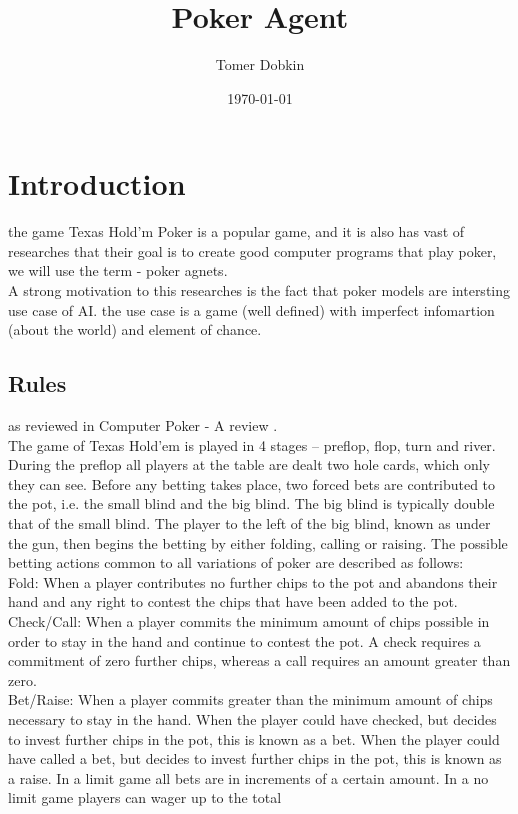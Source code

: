 \documentclass{article}
\title{Poker Agent}
\author{Tomer Dobkin}
\date{\today}
\begin{document}
\maketitle
\section{Introduction}
the game Texas Hold'm Poker is a popular game, and it is also has vast of researches that their goal is to create good computer programs that play poker, we will use the term -  poker agnets.\\
A strong motivation to this researches is the fact that  poker models are intersting use case of AI. the use case is a game (well defined) with imperfect infomartion (about the world) and element of chance.
\subsection{Rules}
as reviewed in Computer Poker - A review \cite{review}.\\
The game of Texas Hold’em is played in 4 stages – preflop, flop, turn and river. During the preflop all players at the
table are dealt two hole cards, which only they can see. Before any betting takes place, two forced bets are contributed to
the pot, i.e. the small blind and the big blind. The big blind is typically double that of the small blind. The player to the left
of the big blind, known as under the gun, then begins the betting by either folding, calling or raising. The possible betting
actions common to all variations of poker are described as follows:\\
Fold: When a player contributes no further chips to the pot and abandons their hand and any right to contest the chips
that have been added to the pot.\\
Check/Call: When a player commits the minimum amount of chips possible in order to stay in the hand and continue to
contest the pot. A check requires a commitment of zero further chips, whereas a call requires an amount greater
than zero.\\
Bet/Raise: When a player commits greater than the minimum amount of chips necessary to stay in the hand. When the
player could have checked, but decides to invest further chips in the pot, this is known as a bet. When the player
could have called a bet, but decides to invest further chips in the pot, this is known as a raise.
In a limit game all bets are in increments of a certain amount. In a no limit game players can wager up to the total
\end{document}
